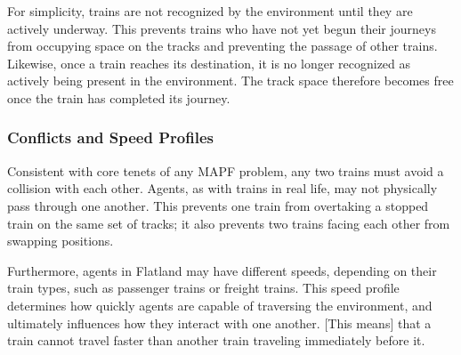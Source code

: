\documentclass[11pt]{article}
\begin{document}
For simplicity, trains are not recognized by the environment until they are actively underway.  This prevents trains who have not yet begun their journeys from occupying space on the tracks and preventing the passage of other trains.  Likewise, once a train reaches its destination, it is no longer recognized as actively being present in the environment.  The track space therefore becomes free once the train has completed its journey.

\subsubsection{Conflicts and Speed Profiles}
Consistent with core tenets of any MAPF problem, any two trains must avoid a collision with each other.  Agents, as with trains in real life, may not physically pass through one another.  This prevents one train from overtaking a stopped train on the same set of tracks; it also prevents two trains facing each other from swapping positions.

Furthermore, agents in Flatland may have different speeds, depending on their train types, such as passenger trains or freight trains.  This speed profile determines how quickly agents are capable of traversing the environment, and ultimately influences how they interact with one another.  [This means] that a train cannot travel faster than another train traveling immediately before it.





\end{document}
